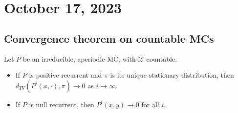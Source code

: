 \section{October 17, 2023}

\subsection{Convergence theorem on countable MCs}

\begin{theorem}
\thmlabel

Let $P$ be an irreducible, aperiodic MC, with $\mathcal{X}$ countable. 

\begin{itemize}
	\item If $P$ is positive recurrent and $\pi$ is its unique stationary distribution, then $d_{TV}(P^i(x,\cdot),\pi)\rightarrow 0$ as $i\rightarrow \infty$. 
	\item If $P$ is null recurrent, then $P^i(x,y)\rightarrow 0$ for all $i$. 
\end{itemize}
\end{theorem}

